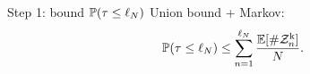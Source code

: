 \begin{block}{Step 1: bound $\P(\tau\le \ell_N)$}
Union bound + Markov:
\[
    \P(\tau\le \ell_N)
    \le
    \sum_{n=1}^{\ell_N}\frac{\E[\#\mathcal Z^{\mathrm k}_n]}{N}.
\]
\end{block}
